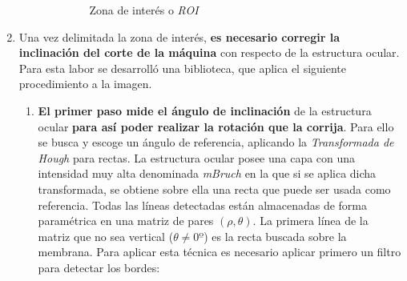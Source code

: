 \begin{enumerate}
\begin{enumerate}[label*=\arabic*.]
\begin{enumerate}[label*=\arabic*.]
      \begin{figure}[H]
        \caption{Zona de interés o \emph{ROI}}
        \centering \setlength\fboxsep{0pt} \setlength\fboxrule{0.5pt}
      \end{figure}

    \end{enumerate}
  \end{enumerate}
\item Una vez delimitada la zona de interés, \textbf{es necesario
    corregir la inclinación del corte de la máquina} con respecto de
  la estructura ocular. \\
  Para esta labor se desarrolló una biblioteca, que aplica el
  siguiente procedimiento a la imagen.
  \begin{enumerate}[label*=\arabic*.]
  \item \textbf{El primer paso mide el ángulo de inclinación} de la
    estructura ocular \textbf{para así poder realizar la rotación que
      la corrija}.  Para ello se busca y escoge un ángulo de
    referencia, aplicando la \emph{Transformada de
      Hough} para rectas. La estructura
    ocular posee una capa con una intensidad muy alta denominada
    \emph{\gls{mBruch}} en la que si se aplica dicha transformada, se
    obtiene sobre ella una recta que puede ser usada como
    referencia. Todas las líneas detectadas están almacenadas de forma
    paramétrica en una matriz de pares $\left(\rho, \theta \right)$.
    La primera línea de la matriz que no sea vertical
    ($\theta \neq 0º$) es la recta buscada sobre la membrana. Para
    aplicar esta técnica es necesario aplicar primero un filtro para
    detectar los bordes:


\end{enumerate}
\end{enumerate}
